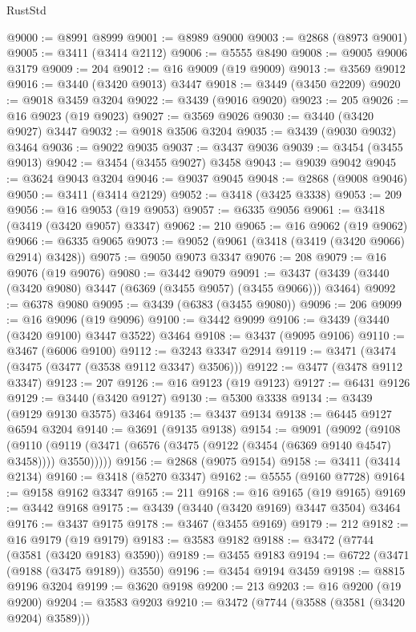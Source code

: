 \begin{lexlean}{RustStd}
\begin{coremodule}
{{{{{{{{{{{{{{{{{{{@9000 := @8991 @8999
@9001 := @8989 @9000
@9003 := @2868 (@8973 @9001)
@9005 := @3411 (@3414 @2112)
@9006 := @5555 @8490
@9008 := @9005 @9006 @3179
@9009 := 204
@9012 := @16 @9009 (@19 @9009)
@9013 := @3569 @9012
@9016 := @3440 (@3420 @9013) @3447
@9018 := @3449 (@3450 @2209)
@9020 := @9018 @3459 @3204
@9022 := @3439 (@9016 @9020)
@9023 := 205
@9026 := @16 @9023 (@19 @9023)
@9027 := @3569 @9026
@9030 := @3440 (@3420 @9027) @3447
@9032 := @9018 @3506 @3204
@9035 := @3439 (@9030 @9032) @3464
@9036 := @9022 @9035
@9037 := @3437 @9036
@9039 := @3454 (@3455 @9013)
@9042 := @3454 (@3455 @9027) @3458
@9043 := @9039 @9042
@9045 := @3624 @9043 @3204
@9046 := @9037 @9045
@9048 := @2868 (@9008 @9046)
@9050 := @3411 (@3414 @2129)
@9052 := @3418 (@3425 @3338)
@9053 := 209
@9056 := @16 @9053 (@19 @9053)
@9057 := @6335 @9056
@9061 := @3418 (@3419 (@3420 @9057) @3347)
@9062 := 210
@9065 := @16 @9062 (@19 @9062)
@9066 := @6335 @9065
@9073 := @9052 (@9061 (@3418 (@3419 (@3420 @9066) @2914) @3428))
@9075 := @9050 @9073 @3347
@9076 := 208
@9079 := @16 @9076 (@19 @9076)
@9080 := @3442 @9079
@9091 := @3437 (@3439 (@3440 (@3420 @9080) @3447 (@6369 (@3455 @9057) (@3455 @9066))) @3464)
@9092 := @6378 @9080
@9095 := @3439 (@6383 (@3455 @9080))
@9096 := 206
@9099 := @16 @9096 (@19 @9096)
@9100 := @3442 @9099
@9106 := @3439 (@3440 (@3420 @9100) @3447 @3522) @3464
@9108 := @3437 (@9095 @9106)
@9110 := @3467 (@6006 @9100)
@9112 := @3243 @3347 @2914
@9119 := @3471 (@3474 (@3475 (@3477 (@3538 @9112 @3347) @3506)))
@9122 := @3477 (@3478 @9112 @3347)
@9123 := 207
@9126 := @16 @9123 (@19 @9123)
@9127 := @6431 @9126
@9129 := @3440 (@3420 @9127)
@9130 := @5300 @3338
@9134 := @3439 (@9129 @9130 @3575) @3464
@9135 := @3437 @9134
@9138 := @6445 @9127 @6594 @3204
@9140 := @3691 (@9135 @9138)
@9154 := @9091
    (@9092
      (@9108
        (@9110 (@9119 (@3471 (@6576 (@3475 (@9122 (@3454 (@6369 @9140 @4547) @3458)))) @3550)))))
@9156 := @2868 (@9075 @9154)
@9158 := @3411 (@3414 @2134)
@9160 := @3418 (@5270 @3347)
@9162 := @5555 (@9160 @7728)
@9164 := @9158 @9162 @3347
@9165 := 211
@9168 := @16 @9165 (@19 @9165)
@9169 := @3442 @9168
@9175 := @3439 (@3440 (@3420 @9169) @3447 @3504) @3464
@9176 := @3437 @9175
@9178 := @3467 (@3455 @9169)
@9179 := 212
@9182 := @16 @9179 (@19 @9179)
@9183 := @3583 @9182
@9188 := @3472 (@7744 (@3581 (@3420 @9183) @3590))
@9189 := @3455 @9183
@9194 := @6722 (@3471 (@9188 (@3475 @9189)) @3550)
@9196 := @3454 @9194 @3459
@9198 := @8815 @9196 @3204
@9199 := @3620 @9198
@9200 := 213
@9203 := @16 @9200 (@19 @9200)
@9204 := @3583 @9203
@9210 := @3472 (@7744 (@3588 (@3581 (@3420 @9204) @3589)))
}}}}}}}}}}}}}}}}}}}
\end{coremodule}
\end{lexlean}
